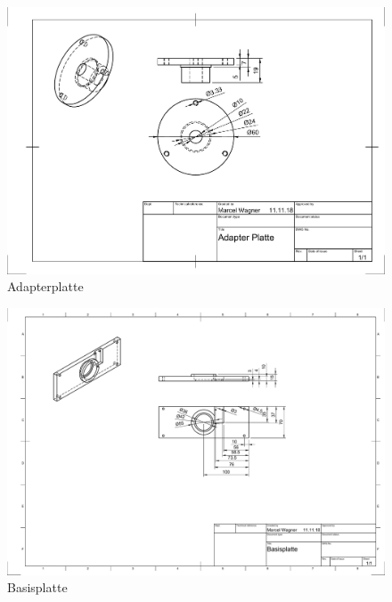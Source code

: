 \begin{figure}
	\includegraphics[angle=90,origin=c, width=\textwidth]{images/Mechanik/Adapterplatte}
	\caption{Adapterplatte}
\end{figure}
\begin{figure}
	\includegraphics[angle=90,origin=c, width=\textwidth]{images/Mechanik/Basisplatte}
	\caption{Basisplatte}
\end{figure}



